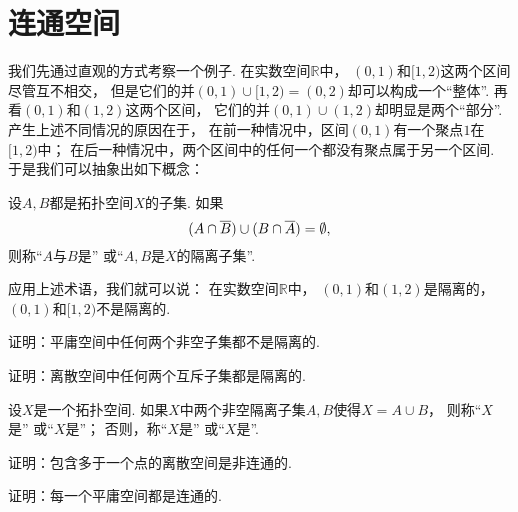 \section{连通空间}
我们先通过直观的方式考察一个例子.
在实数空间\(\mathbb{R}\)中，
\((0,1)\)和\([1,2)\)这两个区间尽管互不相交，
但是它们的并\((0,1)\cup[1,2)=(0,2)\)却可以构成一个“整体”.
再看\((0,1)\)和\((1,2)\)这两个区间，
它们的并\((0,1)\cup(1,2)\)却明显是两个“部分”.
产生上述不同情况的原因在于，
在前一种情况中，区间\((0,1)\)有一个聚点\(1\)在\([1,2)\)中；
在后一种情况中，两个区间中的任何一个都没有聚点属于另一个区间.
于是我们可以抽象出如下概念：
\begin{definition}
设\(A,B\)都是拓扑空间\(X\)的子集.
如果\begin{equation*}
	(A \cap \overline{B}) \cup (B \cap \overline{A}) = \emptyset,
\end{equation*}
则称“\(A\)与\(B\)是”
或“\(A,B\)是\(X\)的隔离子集”.
\end{definition}

应用上述术语，我们就可以说：
在实数空间\(\mathbb{R}\)中，
\((0,1)\)和\((1,2)\)是隔离的，
\((0,1)\)和\([1,2)\)不是隔离的.

\begin{example}
证明：平庸空间中任何两个非空子集都不是隔离的.
\end{example}

\begin{example}
证明：离散空间中任何两个互斥子集都是隔离的.
\end{example}

\begin{definition}
设\(X\)是一个拓扑空间.
如果\(X\)中两个非空隔离子集\(A,B\)使得\(X = A \cup B\)，
则称“\(X\)是”
或“\(X\)是”；
否则，称“\(X\)是”
或“\(X\)是”.
\end{definition}

\begin{example}
证明：包含多于一个点的离散空间是非连通的.
\end{example}

\begin{example}
证明：每一个平庸空间都是连通的.
\end{example}

